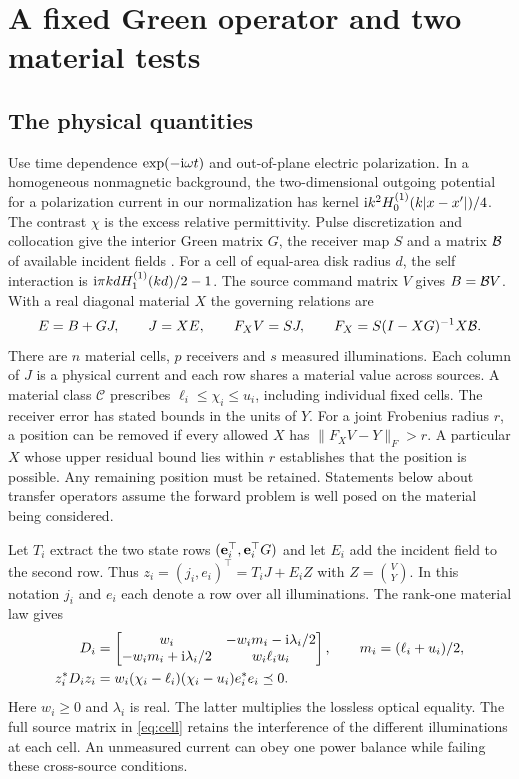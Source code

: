 \section{A fixed Green operator and two material tests}\label{sec:model}
\subsection{The physical quantities}
Use time dependence $\exp(-{\rm i}\omega t)$ and out-of-plane electric polarization. In a homogeneous nonmagnetic background, the two-dimensional outgoing potential for a polarization current in our normalization has kernel ${\rm i}k^2H_0^{(1)}(k|x-x'|)/4$. The contrast $\chi$ is the excess relative permittivity. Pulse discretization and collocation give the interior Green matrix $G$, the receiver map $S$ and a matrix $\mathcal B$ of available incident fields \cite{colton,richmond}. For a cell of equal-area disk radius $d$, the self interaction is ${\rm i}\pi kd H_1^{(1)}(kd)/2-1$. The source command matrix $V$ gives $B=\mathcal B V$. With a real diagonal material $X$ the governing relations are
\begin{equation}
 E=B+GJ,\qquad J=XE,\qquad F_X V=SJ,\qquad
 F_X=S(I-XG)^{-1}X\mathcal B .                                    \label{eq:tm}
\end{equation}
There are $n$ material cells, $p$ receivers and $s$ measured illuminations. Each column of $J$ is a physical current and each row shares a material value across sources. A material class $\mathcal C$ prescribes $\ell_i\leq \chi_i\leq u_i$, including individual fixed cells. The receiver error has stated bounds in the units of $Y$. For a joint Frobenius radius $r$, a position can be removed if every allowed $X$ has $\|F_X V-Y\|_F>r$. A particular $X$ whose upper residual bound lies within $r$ establishes that the position is possible. Any remaining position must be retained. Statements below about transfer operators assume the forward problem is well posed on the material being considered.

Let $T_i$ extract the two state rows $({\bf e}_i^\top,{\bf e}_i^\top G)$ and let $E_i$ add the incident field to the second row. Thus $z_i=(j_i,e_i)^\top=T_iJ+E_i Z$ with $Z=\binom{V}{Y}$. In this notation $j_i$ and $e_i$ each denote a row over all illuminations. The rank-one material law gives
\begin{align}
 D_i&=\begin{bmatrix}
 w_i &-w_i m_i-{\rm i}\lambda_i/2\\
 -w_i m_i+{\rm i}\lambda_i/2&w_i\ell_i u_i
 \end{bmatrix},
 \qquad m_i=(\ell_i+u_i)/2, \notag\\
 z_i^{\ast} D_i z_i&=w_i(\chi_i-\ell_i)(\chi_i-u_i)e_i^{\ast} e_i\preceq0 .
                                                               \label{eq:cell}
\end{align}
Here $w_i\geq0$ and $\lambda_i$ is real. The latter multiplies the lossless optical equality. The full source matrix in \eqref{eq:cell} retains the interference of the different illuminations at each cell. An unmeasured current can obey one power balance while failing these cross-source conditions.

